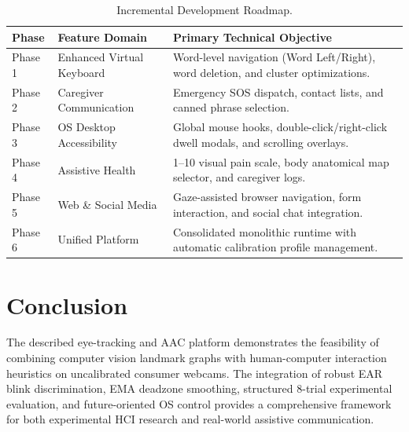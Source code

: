 \documentclass[11pt,a4paper]{article}
\begin{document}
\begin{table}[H]
\centering
\caption{Incremental Development Roadmap.}
\small
\begin{tabularx}{\textwidth}{p{} p{} X}
\toprule
\textbf{Phase} & \textbf{Feature Domain} & \textbf{Primary Technical Objective} \\
\midrule
Phase 1 & Enhanced Virtual Keyboard & Word-level navigation (Word Left/Right), word deletion, and cluster optimizations. \\
Phase 2 & Caregiver Communication & Emergency SOS dispatch, contact lists, and canned phrase selection. \\
Phase 3 & OS Desktop Accessibility & Global mouse hooks, double-click/right-click dwell modals, and scrolling overlays. \\
Phase 4 & Assistive Health & 1--10 visual pain scale, body anatomical map selector, and caregiver logs. \\
Phase 5 & Web \& Social Media & Gaze-assisted browser navigation, form interaction, and social chat integration. \\
Phase 6 & Unified Platform & Consolidated monolithic runtime with automatic calibration profile management. \\
\bottomrule
\end{tabularx}
\end{table}

\section{Conclusion}

The described eye-tracking and AAC platform demonstrates the feasibility of combining computer vision landmark graphs with human-computer interaction heuristics on uncalibrated consumer webcams. The integration of robust EAR blink discrimination, EMA deadzone smoothing, structured 8-trial experimental evaluation, and future-oriented OS control provides a comprehensive framework for both experimental HCI research and real-world assistive communication.
\end{document}
